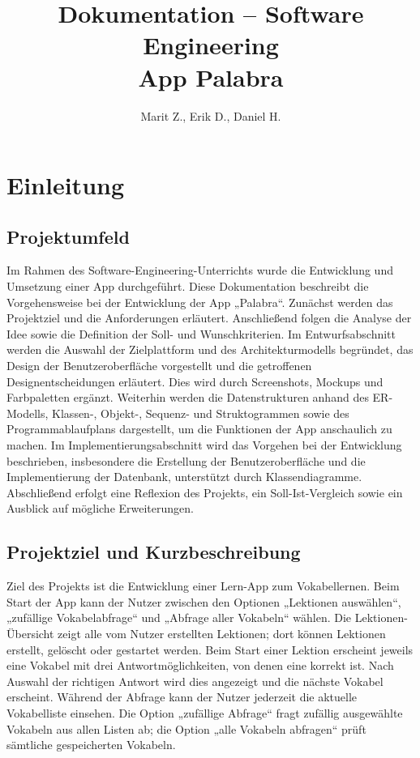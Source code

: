 \documentclass[12pt,a4paper]{article}
\title{\textbf{Dokumentation – Software Engineering\\App Palabra}}
\author{Marit Z., Erik D., Daniel H.}
\date{}
\begin{document}
\maketitle

\tableofcontents
\newpage

\section{Einleitung}

\subsection{Projektumfeld}
Im Rahmen des Software-Engineering-Unterrichts wurde die Entwicklung und Umsetzung einer App durchgeführt. Diese Dokumentation beschreibt die Vorgehensweise bei der Entwicklung der App „Palabra“. Zunächst werden das Projektziel und die Anforderungen erläutert. Anschließend folgen die Analyse der Idee sowie die Definition der Soll- und Wunschkriterien. Im Entwurfsabschnitt werden die Auswahl der Zielplattform und des Architekturmodells begründet, das Design der Benutzeroberfläche vorgestellt und die getroffenen Designentscheidungen erläutert. Dies wird durch Screenshots, Mockups und Farbpaletten ergänzt. Weiterhin werden die Datenstrukturen anhand des ER-Modells, Klassen-, Objekt-, Sequenz- und Struktogrammen sowie des Programmablaufplans dargestellt, um die Funktionen der App anschaulich zu machen. Im Implementierungsabschnitt wird das Vorgehen bei der Entwicklung beschrieben, insbesondere die Erstellung der Benutzeroberfläche und die Implementierung der Datenbank, unterstützt durch Klassendiagramme. Abschließend erfolgt eine Reflexion des Projekts, ein Soll-Ist-Vergleich sowie ein Ausblick auf mögliche Erweiterungen.

\subsection{Projektziel und Kurzbeschreibung}
Ziel des Projekts ist die Entwicklung einer Lern-App zum Vokabellernen. Beim Start der App kann der Nutzer zwischen den Optionen „Lektionen auswählen“, „zufällige Vokabelabfrage“ und „Abfrage aller Vokabeln“ wählen. Die Lektionen-Übersicht zeigt alle vom Nutzer erstellten Lektionen; dort können Lektionen erstellt, gelöscht oder gestartet werden. Beim Start einer Lektion erscheint jeweils eine Vokabel mit drei Antwortmöglichkeiten, von denen eine korrekt ist. Nach Auswahl der richtigen Antwort wird dies angezeigt und die nächste Vokabel erscheint. Während der Abfrage kann der Nutzer jederzeit die aktuelle Vokabelliste einsehen. Die Option „zufällige Abfrage“ fragt zufällig ausgewählte Vokabeln aus allen Listen ab; die Option „alle Vokabeln abfragen“ prüft sämtliche gespeicherten Vokabeln.
\end{document}
